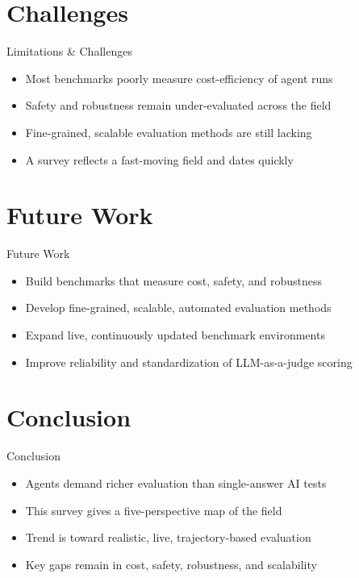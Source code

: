 \documentclass[10pt]{beamer}
\begin{document}
\section{Challenges}
\begin{frame}{Limitations \& Challenges}
\begin{itemize}
  \item Most benchmarks poorly measure cost-efficiency of agent runs
  \item Safety and robustness remain under-evaluated across the field
  \item Fine-grained, scalable evaluation methods are still lacking
  \item A survey reflects a fast-moving field and dates quickly
\end{itemize}
\end{frame}

\section{Future Work}
\begin{frame}{Future Work}
\begin{itemize}
  \item Build benchmarks that measure cost, safety, and robustness
  \item Develop fine-grained, scalable, automated evaluation methods
  \item Expand live, continuously updated benchmark environments
  \item Improve reliability and standardization of LLM-as-a-judge scoring
\end{itemize}
\end{frame}

\section{Conclusion}
\begin{frame}{Conclusion}
\begin{itemize}
  \item Agents demand richer evaluation than single-answer AI tests
  \item This survey gives a five-perspective map of the field
  \item Trend is toward realistic, live, trajectory-based evaluation
  \item Key gaps remain in cost, safety, robustness, and scalability
\end{itemize}
\end{frame}
\end{document}
